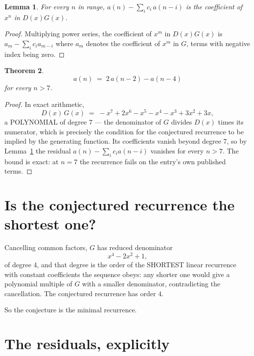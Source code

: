 \documentclass[11pt,a4paper]{article}
\theoremstyle{plain}
\newtheorem{theorem}{Theorem}
\newtheorem{lemma}[theorem]{Lemma}
\theoremstyle{definition}
\begin{document}
\begin{lemma}\label{lem:key}
For every $n$ in range, $a(n)-\sum_i c_i\,a(n-i)$ is the coefficient of $x^{n}$ in
$D(x)G(x)$.
\end{lemma}

\begin{proof}
Multiplying power series, the coefficient of $x^{m}$ in $D(x)G(x)$ is
$a_m-\sum_i c_i a_{m-i}$ where $a_m$ denotes the coefficient of $x^{m}$ in $G$, terms with
negative index being zero.
\end{proof}

\begin{theorem}
\[
a(n)\;=\;2\,a(n-2) - a(n-4)
\]
for every $n>7$.
\end{theorem}

\begin{proof}
In exact arithmetic,
\[
D(x)\,G(x)\;=\;- x^{7} + 2 x^{6} - x^{5} - x^{4} - x^{3} + 3 x^{2} + 3 x,
\]
a POLYNOMIAL of degree $7$ --- the denominator of $G$ divides $D(x)$ times its numerator,
which is precisely the condition for the conjectured recurrence to be implied by the
generating function. Its coefficients vanish beyond degree $7$, so by
Lemma~\ref{lem:key} the residual $a(n)-\sum_ic_ia(n-i)$ vanishes for every
$n>7$. The bound is exact: at $n=7$ the recurrence fails on the entry's own published terms.
\end{proof}

\section{Is the conjectured recurrence the shortest one?}

Cancelling common factors, $G$ has reduced denominator
\[
x^{4} - 2 x^{2} + 1,
\]
of degree $4$, and that degree is the order of the SHORTEST linear recurrence with
constant coefficients the sequence obeys: any shorter one would give a polynomial multiple of
$G$ with a smaller denominator, contradicting the cancellation. The conjectured recurrence has
order $4$.

So the conjecture is the minimal recurrence.

\section{The residuals, explicitly}
\end{document}

